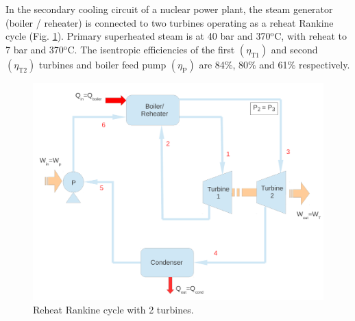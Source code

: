 \documentclass[calculator,steamtables,refrigeranttables,psychrometricchart,datasheet,sample]{exam}
\begin{document}
\clearpage


\begin{question} 
In the secondary cooling circuit of a nuclear power plant, the steam generator (boiler / reheater) is connected to two turbines operating as a reheat Rankine cycle (Fig. \ref{exam_mod01_rankinecycle}). Primary superheated steam is at 40 bar and 370$^{\text{o}}$C, with reheat to 7 bar and 370$^{\text{o}}$C. The isentropic efficiencies of the first $\left(\eta_{\text{T1}}\right)$ and second $\left(\eta_{\text{T2}}\right)$ turbines and boiler feed pump $\left(\eta_{\text{P}}\right)$ are 84$\%$, 80$\%$ and 61$\%$ respectively. 

\begin{figure}[h]
\begin{center}
\includegraphics[width=15.cm,clip]{./Pics/Exam_Reheat_Rankine_Cycle}
\caption{ Reheat Rankine cycle with 2 turbines.}
\label{exam_mod01_rankinecycle}
\end{center}
\end{figure}



\end{question}
\end{document}
